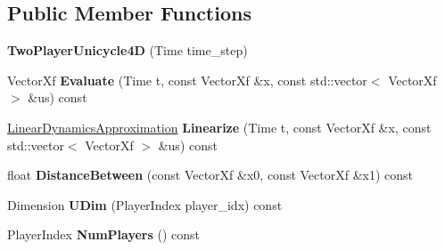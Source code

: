 \subsection*{Public Member Functions}
\begin{DoxyCompactItemize}
\item 
{\bfseries Two\+Player\+Unicycle4D} (Time time\+\_\+step)\hypertarget{classilqgames_1_1_two_player_unicycle4_d_ab1e1f2b5c529f27727bd4b774db7396d}{}\label{classilqgames_1_1_two_player_unicycle4_d_ab1e1f2b5c529f27727bd4b774db7396d}

\item 
Vector\+Xf {\bfseries Evaluate} (Time t, const Vector\+Xf \&x, const std\+::vector$<$ Vector\+Xf $>$ \&us) const \hypertarget{classilqgames_1_1_two_player_unicycle4_d_abeb19eec56195a30c0ec726178d5a316}{}\label{classilqgames_1_1_two_player_unicycle4_d_abeb19eec56195a30c0ec726178d5a316}

\item 
\hyperlink{structilqgames_1_1_linear_dynamics_approximation}{Linear\+Dynamics\+Approximation} {\bfseries Linearize} (Time t, const Vector\+Xf \&x, const std\+::vector$<$ Vector\+Xf $>$ \&us) const \hypertarget{classilqgames_1_1_two_player_unicycle4_d_a07a9e89a52e8177dad08cccc80d343ae}{}\label{classilqgames_1_1_two_player_unicycle4_d_a07a9e89a52e8177dad08cccc80d343ae}

\item 
float {\bfseries Distance\+Between} (const Vector\+Xf \&x0, const Vector\+Xf \&x1) const \hypertarget{classilqgames_1_1_two_player_unicycle4_d_ac04d9ced33073d828df5cc91035b4854}{}\label{classilqgames_1_1_two_player_unicycle4_d_ac04d9ced33073d828df5cc91035b4854}

\item 
Dimension {\bfseries U\+Dim} (Player\+Index player\+\_\+idx) const \hypertarget{classilqgames_1_1_two_player_unicycle4_d_ab669f54b874b51fd96ea28313d737131}{}\label{classilqgames_1_1_two_player_unicycle4_d_ab669f54b874b51fd96ea28313d737131}

\item 
Player\+Index {\bfseries Num\+Players} () const \hypertarget{classilqgames_1_1_two_player_unicycle4_d_ac2d8077da95177fc424cc49373c90c3a}{}\label{classilqgames_1_1_two_player_unicycle4_d_ac2d8077da95177fc424cc49373c90c3a}

\end{DoxyCompactItemize}
